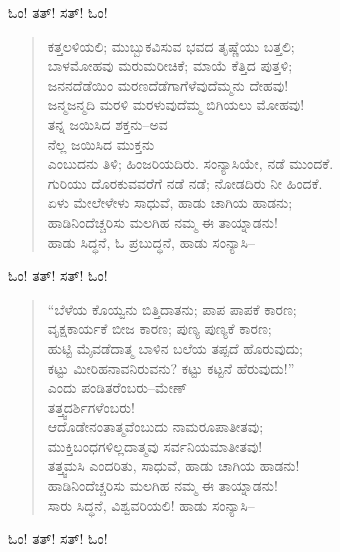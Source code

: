 \begin{flushright}
ಓಂ! ತತ್! ಸತ್! ಓಂ!
\end{flushright}

\begin{verse}
ಕತ್ತಲಳಿಯಲಿ; ಮುಬ್ಬುಕವಿಸುವ ಭವದ ತೃಷ್ಣೆಯು ಬತ್ತಲಿ;\\ಬಾಳಮೋಹವು ಮರುಮರೀಚಿಕೆ; ಮಾಯೆ ಕೆತ್ತಿದ ಪುತ್ತಳಿ;\\ಜನನದೆಡೆಯಿಂ ಮರಣದೆಡೆಗಾಗೆಳೆವುದೆಮ್ಮನು ದೇಹವು!\\ಜನ್ಮಜನ್ಮದಿ ಮರಳಿ ಮರಳುವುದೆಮ್ಮ ಬಿಗಿಯಲು ಮೋಹವು!\\ತನ್ನ ಜಯಿಸಿದ ಶಕ್ತನು–ಅವ\\ ನೆಲ್ಲ ಜಯಿಸಿದ ಮುಕ್ತನು\\ಎಂಬುದನು ತಿಳಿ; ಹಿಂಜರಿಯದಿರು. ಸಂನ್ಯಾಸಿಯೇ, ನಡೆ ಮುಂದಕೆ.\\ಗುರಿಯು ದೊರಕುವವರೆಗೆ ನಡೆ ನಡೆ; ನೋಡದಿರು ನೀ ಹಿಂದಕೆ.\\ಏಳು ಮೇಲೇಳೇಳು ಸಾಧುವೆ, ಹಾಡು ಚಾಗಿಯ ಹಾಡನು;\\ಹಾಡಿನಿಂದೆಚ್ಚರಿಸು ಮಲಗಿಹ ನಮ್ಮ ಈ ತಾಯ್ನಾಡನು!\\ಹಾಡು ಸಿದ್ಧನೆ, ಓ ಪ್ರಬುದ್ಧನೆ, ಹಾಡು ಸಂನ್ಯಾಸಿ–
\end{verse}

\begin{flushright}
ಓಂ! ತತ್! ಸತ್! ಓಂ!
\end{flushright}

\begin{verse}
“ಬೆಳೆಯ ಕೊಯ್ವನು ಬಿತ್ತಿದಾತನು; ಪಾಪ ಪಾಪಕೆ ಕಾರಣ;\\ವೃಕ್ಷಕಾರ್ಯಕೆ ಬೀಜ ಕಾರಣ; ಪುಣ್ಯ ಪುಣ್ಯಕೆ ಕಾರಣ;\\ಹುಟ್ಟಿ ಮೈವಡೆದಾತ್ಮ ಬಾಳಿನ ಬಲೆಯ ತಪ್ಪದೆ ಹೊರುವುದು;\\ಕಟ್ಟು ಮೀರಿಹನಾವನಿರುವನು? ಕಟ್ಟು ಕಟ್ಟನೆ ಹೆರುವುದು!”\\ಎಂದು ಪಂಡಿತರೆಂಬರು–ಮೇಣ್\\ತತ್ತ್ವದರ್ಶಿಗಳೆಂಬರು!\\ಆದೊಡೇನಂತಾತ್ಮವೆಂಬುದು ನಾಮರೂಪಾತೀತವು;\\ಮುಕ್ತಿಬಂಧಗಳಿಲ್ಲದಾತ್ಮವು ಸರ್ವನಿಯಮಾತೀತವು!\\ತತ್ತ್ವಮಸಿ ಎಂದರಿತು, ಸಾಧುವೆ, ಹಾಡು ಚಾಗಿಯ ಹಾಡನು!\\ಹಾಡಿನಿಂದೆಚ್ಚರಿಸು ಮಲಗಿಹ ನಮ್ಮ ಈ ತಾಯ್ನಾಡನು!\\ಸಾರು ಸಿದ್ಧನೆ, ವಿಶ್ವವರಿಯಲಿ! ಹಾಡು ಸಂನ್ಯಾಸಿ–
\end{verse}

\begin{flushright}
ಓಂ! ತತ್! ಸತ್! ಓಂ!
\end{flushright}


